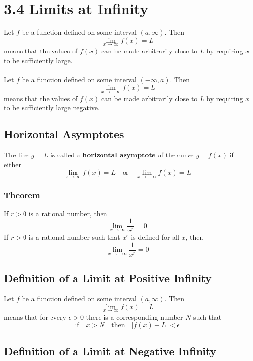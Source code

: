 %
%

\section*{3.4 Limits at Infinity}

Let \(f\) be a function defined on some interval \((a, \infty)\). Then
$$ \lim_{x \to \infty}f(x) = L $$
means that the values of \(f(x)\) can be made arbitrarily close to \(L\) by requiring \(x\) to be sufficiently large.
\\\\
Let \(f\) be a function defined on some interval \((-\infty, a)\). Then
$$ \lim_{x \to -\infty}f(x) = L $$
means that the values of \(f(x)\) can be made arbitrarily close to \(L\) by requiring \(x\) to be sufficiently large negative.

\subsection*{Horizontal Asymptotes}

The line \(y=L\) is called a \textbf{horizontal asymptote} of the curve \(y=f(x)\) if either
$$\lim_{x \to \infty}f(x)=L \quad \text{or} \quad \lim_{x \to -\infty}f(x)=L$$

\subsubsection*{Theorem}

If \(r>0\) is a rational number, then
$$ \lim_{x \to \infty}\frac{1}{x^r}=0 $$
If \(r>0\) is a rational number such that \(x^r\) is defined for all \(x\), then
$$ \lim_{x \to -\infty}\frac{1}{x^r}=0 $$

\subsection*{Definition of a Limit at Positive Infinity}

Let \(f\) be a function defined on some interval \((a, \infty)\). Then
$$ \lim_{x \to \infty}f(x)=L$$
means that for every \(\epsilon>0\) there is a corresponding number \(N\) such that 
$$ \text{if} \quad x>N \quad \text{then} \quad \left| f(x)-L \right| <\epsilon $$ 

\subsection*{Definition of a Limit at Negative Infinity}

